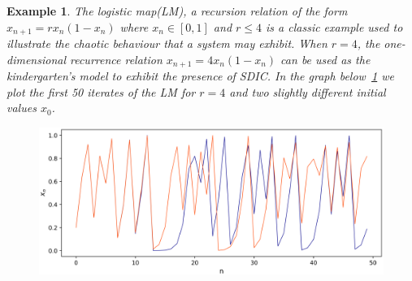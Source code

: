 \documentclass[a4paper,12pt,twoside]{report}
\newtheorem{Example}{Example}[]
\begin{document}
\begin{Example} \rm
  The logistic map(LM), a recursion relation of the form $x_{n+1}=rx_n(1-x_n)$ where $x_n\in[0,1]$ and $r\leq{4}$ is a classic example used to illustrate the chaotic behaviour that a system may exhibit. When $r=4$, the one-dimensional recurrence relation $x_{n+1}=4x_n(1-x_n)$ can be used as the kindergarten's model to exhibit the presence of SDIC. 
  In the graph below~\ref{fig:log_sdic} we plot the first 50 iterates of the LM for $r=4$ and two slightly different initial values $x_0$.

  \begin{figure}[ht]
    \includegraphics[scale=0.74]{_logistic_sdic.eps}
        \centering
        \label{fig:log_sdic}
      \end{figure}
\end{Example}
\end{document}
